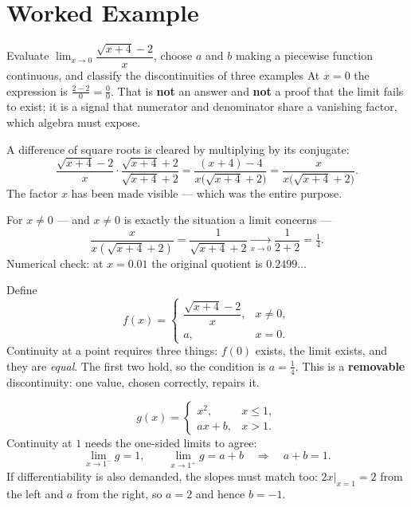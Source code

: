 \section{Worked Example}

\begin{worked}{Evaluate $\lim_{x\to0}\dfrac{\sqrt{x+4}-2}{x}$, choose $a$ and $b$ making a piecewise function continuous, and classify the discontinuities of three examples}
At $x=0$ the expression is $\frac{2-2}{0}=\frac00$. That is \textbf{not} an
answer and \textbf{not} a proof that the limit fails to exist; it is a
signal that numerator and denominator share a vanishing factor, which
algebra must expose.

A difference of square roots is cleared by multiplying by its conjugate:
\[
  \frac{\sqrt{x+4}-2}{x}\cdot\frac{\sqrt{x+4}+2}{\sqrt{x+4}+2}
  =\frac{(x+4)-4}{x\bigl(\sqrt{x+4}+2\bigr)}
  =\frac{x}{x\bigl(\sqrt{x+4}+2\bigr)} .
\]
The factor $x$ has been made visible --- which was the entire purpose.

For $x\neq0$ --- and $x\neq0$ is exactly the situation a limit concerns ---
\[
  \frac{x}{x(\sqrt{x+4}+2)}=\frac{1}{\sqrt{x+4}+2}
  \xrightarrow[x\to0]{}\frac{1}{2+2}=\boxed{\tfrac14}.
\]
Numerical check: at $x=0.01$ the original quotient is $0.2499\ldots$
\checkmark

Define
\[
  f(x)=\begin{cases}\dfrac{\sqrt{x+4}-2}{x}, & x\neq0,\\[1.2ex] a, & x=0.\end{cases}
\]
Continuity at a point requires three things: $f(0)$ exists, the limit
exists, and they are \emph{equal}. The first two hold, so the condition is
$a=\tfrac14$. This is a \textbf{removable} discontinuity: one value, chosen
correctly, repairs it.

\[
  g(x)=\begin{cases}x^{2}, & x\le1,\\ ax+b, & x>1.\end{cases}
\]
Continuity at $1$ needs the one-sided limits to agree:
\[
  \lim_{x\to1^{-}}g=1,\qquad \lim_{x\to1^{+}}g=a+b
  \quad\Longrightarrow\quad a+b=1 .
\]
If differentiability is also demanded, the slopes must match too:
$2x|_{x=1}=2$ from the left and $a$ from the right, so $a=2$ and hence
$b=-1$.


\end{worked}

